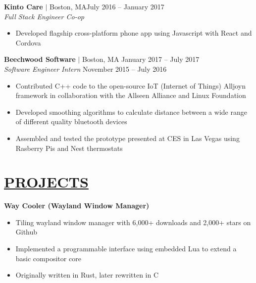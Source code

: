 \documentclass[overlapped,line]{res}
\begin{document}
\begin{resume}
\textbf{Kinto Care} $|$ Boston, MA\hfill July 2016 \--- January 2017\\
{\sl Full Stack Engineer Co-op}
\begin{itemize} \itemsep -2pt
	\item Developed flagship cross-platform phone app using Javascript with React and Cordova
\end{itemize}

\textbf{Beechwood Software} $|$ Boston, MA \hfill January 2017 \--- July 2017\\
{\sl Software Engineer Intern} \hfill November 2015 \--- July 2016
\begin{itemize}  \itemsep -2pt
	\item Contributed C++ code to the open-source IoT (Internet of Things) Alljoyn framework in collaboration with the Allseen Alliance and Linux Foundation
	\item Developed smoothing algorithms to calculate distance between a wide range of different quality bluetooth devices
	\item Assembled and tested the prototype presented at CES in Las Vegas using Rasberry Pis and Nest thermostats
\end{itemize}
\noindent\makebox[7.15in]{\rule{7.15in}{0.4pt}}


\section{\underline{PROJECTS}}
\textbf{Way Cooler (Wayland Window Manager)}
\begin{itemize}  \itemsep -2pt
	\item Tiling wayland window manager with 6,000+ downloads and 2,000+ stars on Github
	\item Implemented a programmable interface using embedded Lua to extend
      a basic compositor core
    \item Originally written in Rust, later rewritten in C
\end{itemize}



\end{resume}
\end{document}
